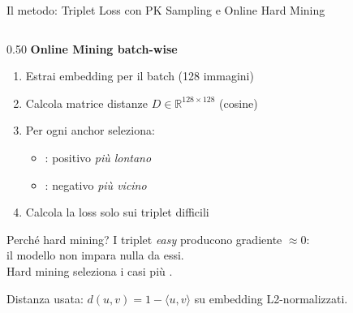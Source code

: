 \documentclass[aspectratio=169, 10pt]{beamer}
\begin{document}
\begin{frame}{Il metodo: Triplet Loss con PK Sampling e Online Hard Mining}
\begin{columns}[T, onlytextwidth]
\begin{column}{0.50\textwidth}
    \textbf{Online Mining batch-wise}\\[0.35em]
    \small
    \begin{enumerate}
        \item Estrai embedding per il batch (128 immagini)
        \item Calcola matrice distanze $D\in\mathbb{R}^{128\times128}$ (cosine)
        \item Per ogni anchor seleziona:
        \begin{itemize}
            \item {}: positivo \emph{più lontano}
            \item {}: negativo \emph{più vicino}
        \end{itemize}
        \item Calcola la loss solo sui triplet difficili
    \end{enumerate}

    \medskip
    \begin{block}{\small Perché hard mining?}
        \small I triplet \emph{easy} producono gradiente $\approx 0$:\\
        il modello non impara nulla da essi.\\
        Hard mining seleziona i casi più .
    \end{block}

    \medskip
    {\small Distanza usata:
    $d(u,v) = 1 - \langle u,v\rangle$
    su embedding L2-normalizzati.}
\end{column}

\end{columns}
\end{frame}
\end{document}
